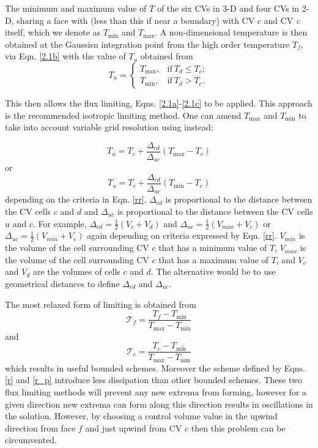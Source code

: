 The minimum and maximum value of $T$ of the six CVs in 3-D and four CVs in 2-D, sharing a face with (less than this if near a boundary) with CV $c$ and CV \textit{c} itself, which we denote as $T_{\min}$ and $T_{\max}$. A non-dimensional temperature is then obtained at the Gaussisn integration point from the high order temperature $T_{f}$, via Eqn. \ref{2.1b} with the value of $T_{u}$ obtained from
\begin{equation}
T_{u} =
\begin{cases}
   T_{\max}, & \text{if} \ T_{d} \leq T_{c}; \\
   T_{\min}, & \text{if} \ T_{d} > T_{c}.
\end{cases}
\label{rr}
\end{equation}

This then allows the flux limiting, Eqns. \ref{2.1a}-\ref{2.1c} to be applied. This approach is the recommended isotropic limiting method.  One can amend $T_{\max}$ and $T_{\min}$ to take into account variable grid resolution using instead:

\begin{equation}
T_u = T_c + \frac{\Delta_{cd}}{\Delta_{uc}} ( T_{\max} - T_c)
\end{equation}
\noindent
or\\
\begin{equation}
T_u = T_c + \frac{\Delta_{cd}}{\Delta_{uc}} ( T_{\min} - T_c)
\end{equation}
depending on the criteria in Eqn. \ref{rr}. $\Delta_{cd}$ is proportional to the distance between the CV cells $c$ and $d$ and $\Delta_{uc}$ is proportional to the distance between the CV cells $u$ and $c$. For example, $\Delta_{cd} = \frac{1}{2}(V_c + V_d)$ and  $\Delta_{uc} = \frac{1}{2}(V_{max} + V_c)$ or  $\Delta_{uc} = \frac{1}{2}(V_{min} + V_c)$ again  depending on criteria expressed by Eqn. \ref{rr}. $V_{min}$ is the volume of  the cell surrounding CV $c$ that has a minimum value of $T$,  $V_{max}$ is the volume of  the cell surrounding CV $c$ that has a maximum value of $T$, and $V_c$ and $V_d$ are the volumes of cells $c$ and $d$.  The alternative would be to use geometrical distances to define $\Delta_{cd}$ and $\Delta_{uc}$.

The most relaxed form of limiting is obtained from
\begin{equation}
\mathcal{T}_{f} = \frac{T_{f} - T_{\min}}{T_{\max} - T_{\min}}
\label{r}
\end{equation}
\noindent
and
\begin{equation}
\mathcal{T}_{c} = \frac{T_{c} - T_{\min}}{T_{\max} - T_{\min}}
\label{r_p}
\end{equation}
which results in useful bounded schemes. Moreover the scheme defined by Eqns. \ref{r} and \ref{r_p} introduce less dissipation than other bounded
schemes. These two flux limiting methods will prevent any new extrema from forming, however for a given direction new extrema can form along this direction results in oscillations in the solution. However, by choosing a control volume value in the upwind direction from face $f$ and just upwind from CV $c$ then this problem can be circumvented.


